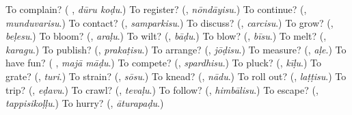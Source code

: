 \begin{tcolorbox}[breakable,colback=teal!4,colframe=teal!35!black,title={Before you move on}]
To complain? (\textbf{ }, \emph{dūru koḍu}.) To register? (\textbf{}, \emph{nōndāyisu}.) To continue? (\textbf{}, \emph{munduvarisu}.) To contact? (\textbf{}, \emph{samparkisu}.) To discuss? (\textbf{}, \emph{carcisu}.) To grow? (\textbf{}, \emph{beḷesu}.) To bloom? (\textbf{}, \emph{araḷu}.) To wilt? (\textbf{}, \emph{bāḍu}.) To blow? (\textbf{}, \emph{bīsu}.) To melt? (\textbf{}, \emph{karagu}.) To publish? (\textbf{}, \emph{prakaṭisu}.) To arrange? (\textbf{}, \emph{jōḍisu}.) To measure? (\textbf{}, \emph{aḷe}.) To have fun? (\textbf{ }, \emph{majā māḍu}.) To compete? (\textbf{}, \emph{spardhisu}.) To pluck? (\textbf{}, \emph{kīḷu}.) To grate? (\textbf{}, \emph{turi}.) To strain? (\textbf{}, \emph{sōsu}.) To knead? (\textbf{}, \emph{nādu}.) To roll out? (\textbf{}, \emph{laṭṭisu}.) To trip? (\textbf{}, \emph{eḍavu}.) To crawl? (\textbf{}, \emph{tevaḷu}.) To follow? (\textbf{}, \emph{himbālisu}.) To escape? (\textbf{}, \emph{tappisikoḷḷu}.) To hurry? (\textbf{}, \emph{āturapaḍu}.)
\end{tcolorbox}
